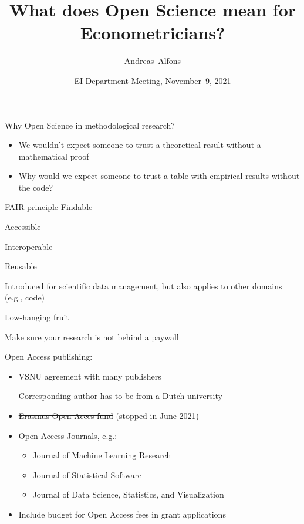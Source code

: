 \documentclass[pdfpagelabels=false, usepdftitle=false]{beamer}
\title{What does Open Science mean for Econometricians?}
\author{
  Andreas~Alfons
}
\institute[EUR]{Erasmus School of Economics, Erasmus University Rotterdam}
\date{EI Department Meeting, November~9, 2021}
\begin{document}
\ESEtitleframe



\begin{frame}{Why Open Science in methodological research?}
\begin{itemize}
  \item We wouldn't expect someone to trust a theoretical result without a
  mathematical proof
  \vfill
  \item Why would we expect someone to trust a table with empirical results
  without the code?
\end{itemize}
\end{frame}


\begin{frame}{FAIR principle}
\alert{F}indable

\bigskip
\alert{A}ccessible

\bigskip
\alert{I}nteroperable

\bigskip
\alert{R}eusable

\vfill

\begin{itemize}
  \arrowitem Introduced for scientific data management, but also applies to
  other domains (e.g., code)
\end{itemize}
\end{frame}


\begin{frame}[t]{Low-hanging fruit}
\begin{itemize}
  \arrowitem \alert{Make sure your research is not behind a paywall}
\end{itemize}

\vfill

Open Access publishing:
\medskip
\begin{itemize}
  \item VSNU agreement with many publishers
  \begin{itemize}
    \arrowitem Corresponding author has to be from a Dutch university
  \end{itemize}
  \smallskip
  \item \sout{Erasmus Open Acces fund} (stopped in June 2021)
  \smallskip
  \item Open Access Journals, e.g.:
  \begin{itemize}
    \item Journal of Machine Learning Research
    \item Journal of Statistical Software
    \item Journal of Data Science, Statistics, and Visualization
  \end{itemize}
  \smallskip
  \item Include budget for Open Access fees in grant applications
\end{itemize}
\end{frame}
\end{document}
